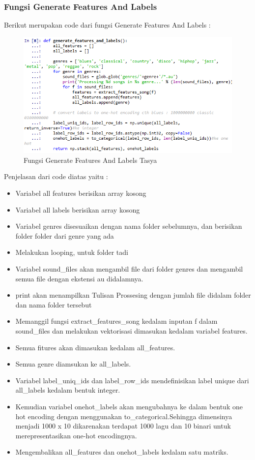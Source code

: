 \subsubsection{Fungsi Generate Features And Labels}
Berikut merupakan code dari fungsi Generate Features And Labels :\\
\begin{figure}[ht]
\centering
\includegraphics[scale=0.5]{figures/chapter6tasya10.png}
\caption{Fungsi Generate Features And Labels Tasya}
\label{Praktek}
\end{figure}
Penjelasan dari code diatas yaitu :
\begin{itemize}
\item Variabel all features berisikan array kosong
\item Variabel all labels berisikan array kosong
\item Variabel genres disesuaikan dengan nama folder sebelumnya, dan berisikan folder folder dari genre yang ada
\item Melakukan looping, untuk folder tadi
\item Variabel sound\_files akan mengambil file dari folder genres dan mengambil semua file dengan ekstensi au didalamnya.
\item print akan menampilkan Tulisan Prossesing dengan jumlah file didalam folder dan nama folder tersebut
\item Memanggil fungsi extract\_features\_song kedalam inputan f dalam sound\_files dan melakukan vektorisasi dimasukan kedalam variabel features.
\item Semua fitures akan dimasukan kedalam all\_features.
\item Semua genre diamsukan ke all\_labels.
\item Variabel label\_uniq\_ids dan label\_row\_ids mendefinisikan label unique dari all\_labels kedalam bentuk integer.
\item Kemudian variabel onehot\_labels akan mengubahnya ke dalam bentuk one hot encoding dengan menggunakan to\_categorical.Sehingga dimensinya menjadi 1000 x 10 dikarenakan terdapat 1000 lagu dan 10 binari untuk merepresentasikan one-hot encodingnya.
\item Mengembalikan all\_features dan onehot\_labels kedalam satu matriks.
\end{itemize}


